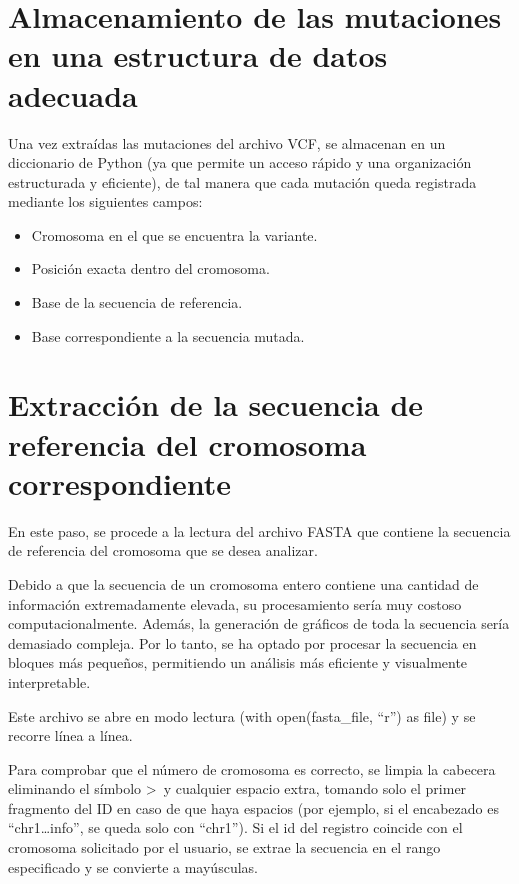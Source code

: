 \documentclass[11pt,spanish,listoffigures,listoftables]{tfgetsinf}
\begin{document}
\section{Almacenamiento de las mutaciones en una estructura de datos adecuada}

Una vez extraídas las mutaciones del archivo \ac{VCF}, se almacenan en un diccionario de Python (ya que permite un acceso rápido y una organización estructurada y eficiente), de tal manera que cada mutación queda registrada mediante los siguientes campos: 

\begin{itemize}
   \item Cromosoma en el que se encuentra la variante.
   \item Posición exacta dentro del cromosoma.
   \item Base de la secuencia de referencia.
   \item Base correspondiente a la secuencia mutada.
\end{itemize}

\section{Extracción de la secuencia de referencia del cromosoma correspondiente}

En este paso, se procede a la lectura del archivo \ac{FASTA} que contiene la secuencia de referencia del cromosoma que se desea analizar.  

Debido a que la secuencia de un cromosoma entero contiene una cantidad de información extremadamente elevada, su procesamiento sería muy costoso computacionalmente. Además, la generación de gráficos de toda la secuencia sería demasiado compleja. Por lo tanto, se ha optado por procesar la secuencia en bloques más pequeños, permitiendo un análisis más eficiente y visualmente interpretable. 

Este archivo se abre en modo lectura (with open(fasta\_file, ``r'') as file) y se recorre línea a línea.

Para comprobar que el número de cromosoma es correcto, se limpia la cabecera eliminando el símbolo >\ y cualquier espacio extra, tomando solo el primer fragmento del ID en caso de que haya espacios (por ejemplo, si el encabezado es ``chr1\dots info'', se queda solo con ``chr1''). Si el id del registro coincide con el cromosoma solicitado por el usuario, se extrae la secuencia en el rango especificado y se convierte a mayúsculas. 
\end{document}
